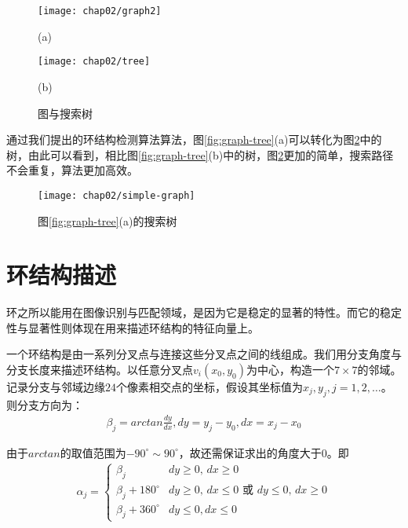 \begin{figure}
\centering
  \begin{minipage}[b]{1\textwidth} 
      \centering 
       \texttt{[image: chap02/graph2]}
       \centerline{(a)}\medskip
    \end{minipage}
  \begin{minipage}[b]{1\textwidth}
    \centering
    \texttt{[image: chap02/tree]}
    \centerline{(b)}\medskip
  \end{minipage}
\caption{图与搜索树}
\label{fig:cycle-tree}
\end{figure}

通过我们提出的环结构检测算法算法，图\ref{fig:graph-tree}(a)可以转化为图\ref{fig:simple-tree}中的树，由此可以看到，相比图\ref{fig:graph-tree}(b)中的树，图\ref{fig:simple-tree}更加的简单，搜索路径不会重复，算法更加高效。

\begin{figure}
\centering
\texttt{[image: chap02/simple-graph]}
\caption{图\ref{fig:graph-tree}(a)的搜索树}
\label{fig:simple-tree}
\end{figure}


\section{环结构描述}
\label{}
环之所以能用在图像识别与匹配领域，是因为它是稳定的显著的特性。而它的稳定性与显著性则体现在用来描述环结构的特征向量上。

一个环结构是由一系列分叉点与连接这些分叉点之间的线组成。我们用分支角度与分支长度来描述环结构。以任意分叉点$v_i(x_0, y_0)$为中心，构造一个$7 \times 7$的邻域。记录分支与邻域边缘$24$个像素相交点的坐标，假设其坐标值为$x_j, y_j, j=1, 2, \ldots$。则分支方向为：
\begin{align}
\beta_j = arctan\frac{dy}{dx}, dy = y_j - y_0, dx = x_j - x_0 
\end{align}

由于$arctan$的取值范围为$-90^{\circ} \sim 90^{\circ}$，故还需保证求出的角度大于$0$。即
\begin{align}
\alpha_j = \left\{ \begin{array}{ll}
\beta_j & \textrm{$dy \geq 0$, $dx \geq 0$} \\
\beta_j + 180^{\circ} & \textrm{$dy \geq 0$, $dx \leq 0$ 或 $dy \leq 0$, $dx \geq 0$}\\
\beta_j + 360^{\circ} & \textrm{$dy \leq 0, dx \leq 0$}
\end{array} \right.
\end{align}

